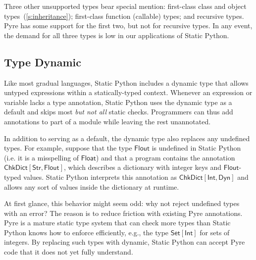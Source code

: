 \documentclass[english,cleveref,submission]{programming}
\newcommand{\SP}{Static Python}
\newcommand{\typefont}[1]{\mathsf{#1}}
\newcommand{\paramtype}[2]{#1[#2]}
\newcommand{\sptint}{\typefont{Int}}
\newcommand{\sptstr}{\typefont{Str}}
\newcommand{\sptfloat}{\typefont{Float}}
\newcommand{\sptflout}{\typefont{Flout}}
\newcommand{\sptdyn}{\typefont{Dyn}}
\newcommand{\sptset}[1]{\paramtype{\typefont{Set}}{#1}}
\newcommand{\sptchkdict}[2]{\paramtype{\typefont{ChkDict}}{#1, #2}}
\begin{document}
Three other unsupported types bear special mention:
first-class class and object types~(\cref{s:inheritance});
first-class function (callable) types; and
recursive types.
Pyre has some support for the first two, but not for recursive types.
In any event, the demand for all three types is low in our applications
of \SP{}.


\subsection{Type Dynamic}
\label{s:type-dynamic}


Like most gradual languages, \SP{} includes a dynamic type
that allows untyped expressions within a statically-typed context.
Whenever an expression or variable lacks a type annotation, \SP{} uses the
dynamic type as a default and skips most \emph{but not all\/} static checks.
Programmers can thus add annotations to part of a module
while leaving the rest unannotated.

In addition to serving as a default, the dynamic type also replaces any undefined types.
For example, suppose that the type $\sptflout{}$ is undefined in \SP{}
(i.e. it is a misspelling of $\sptfloat$) and that a
program contains the annotation $\sptchkdict{\sptstr}{\sptflout}$, which describes a
dictionary with integer keys and $\sptflout$-typed values.
\SP{} interprets this annotation as $\sptchkdict{\sptint}{\sptdyn}$ and allows any sort
of values inside the dictionary at runtime.

At first glance, this behavior might seem odd: why not reject undefined types with an error?
The reason is to reduce friction with existing Pyre annotations.
Pyre is a mature static type system that can check more types than \SP{} knows how to enforce
efficiently, e.g., the type $\sptset{\sptint}$ for sets of integers.
By replacing such types with dynamic, \SP{} can accept Pyre code that it does not yet fully understand.
\end{document}
